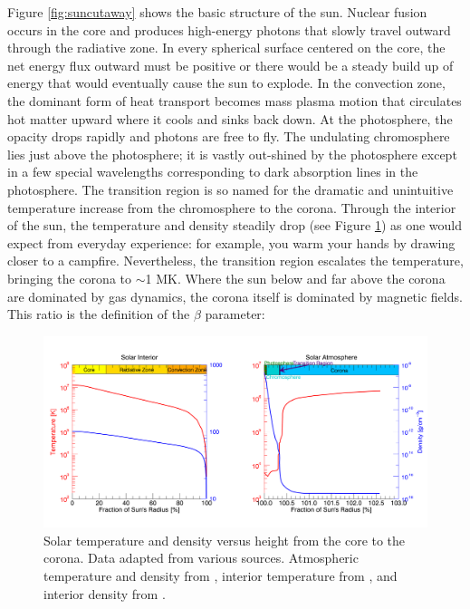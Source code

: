 Figure \ref{fig:suncutaway} shows the basic structure of the sun. Nuclear fusion occurs in the core and produces high-energy photons that slowly travel outward through the radiative zone. In every spherical surface centered on the core, the net energy flux outward must be positive or there would be a steady build up of energy that would eventually cause the sun to explode. In the convection zone, the dominant form of heat transport becomes mass plasma motion that circulates hot matter upward where it cools and sinks back down. At the photosphere, the opacity drops rapidly and photons are free to fly. The undulating chromosphere lies just above the photosphere; it is vastly out-shined by the photosphere except in a few special wavelengths corresponding to dark absorption lines in the photosphere. The transition region is so named for the dramatic and unintuitive temperature increase from the chromosphere to the corona. Through the interior of the sun, the temperature and density steadily drop (see Figure \ref{fig:suntemperaturedensity}) as one would expect from everyday experience: for example, you warm your hands by drawing closer to a campfire. Nevertheless, the transition region escalates the temperature, bringing the corona to $\sim$1 MK. Where the sun below and far above the corona are dominated by gas dynamics, the corona itself is dominated by magnetic fields. This ratio is the definition of the $\beta$ parameter:

\begin{figure}[!h]
    \begin{center}
	    \includegraphics[width=\textwidth]{Images/SolarTemperatureAndDensity.png}
    \end{center}
    \caption[Solar temperature and density versus height]{
        Solar temperature and density versus height from the core to the corona. Data adapted
        from various sources. Atmospheric temperature and density from \citet{Eddy1979}, 
        interior temperature from \citet{Lang2001}, and interior density from  
        \citet{Christensen-Dalsgaard1996}.         
    }
    \label{fig:suntemperaturedensity}
\end{figure}

